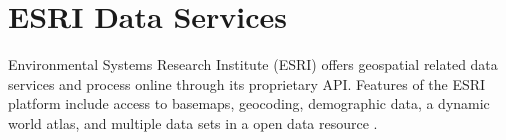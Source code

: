 \section{ESRI Data Services}

Environmental Systems Research Institute (ESRI) offers geospatial related
data services and process online through its proprietary API.  Features of
the ESRI platform include access to basemaps, geocoding, demographic data,
a dynamic world atlas, and multiple data sets in a open data
resource \cite{ESRI2018}.
